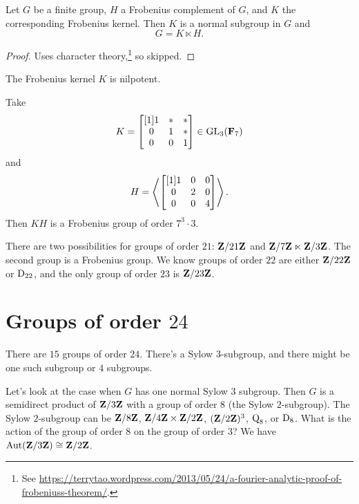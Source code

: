 \documentclass[11pt, oneside]{amsart}
\begin{document}
\begin{theorem}[Frobenius]\label{frob}
Let $G$ be a finite group, $H$ a Frobenius complement of $G$, and $K$ the corresponding Frobenius kernel. Then $K$ is a normal subgroup in $G$ and 
$$
G = K\ltimes H.
$$
\end{theorem}

\begin{proof}
Uses character theory,\footnote{See \url{https://terrytao.wordpress.com/2013/05/24/a-fourier-analytic-proof-of-frobeniuss-theorem/}.} so skipped.
\end{proof}

\begin{theorem}[Thompson]\label{thom}
The Frobenius kernel $K$ is nilpotent.
\end{theorem}
\begin{example}
Take 
$$
K = \begin{bmatrix} [1]  1 & * & * \\ 0 &1 &*\\ 0&0&1\end{bmatrix} \in \operatorname{GL}_3({\mathbf F_7})
$$
and 
$$
H = \left \langle \begin{bmatrix} [1]  1 & 0&0  \\ 0 &2 &0\\ 0&0&4\end{bmatrix}\right \rangle .
$$
Then $KH $ is a Frobenius group of order $7^3\cdot 3$.
\end{example}

There are two possibilities for groups of order $21$: $\mathbf Z/21\mathbf Z$ and $\mathbf Z/7\mathbf Z\ltimes \mathbf Z/3\mathbf Z$. The second group is a Frobenius group. We know groups of order $22$ are either $\mathbf Z/22\mathbf Z$ or $\operatorname{D}_{22}$, and the only group of order $23$ is $\mathbf Z/23\mathbf Z$.

\section{Groups of order $24$}
There are $15$ groups of order $24$. There's a Sylow $3$-subgroup, and there might be one such subgroup or $4$ subgroups. 

Let's look at the case when $G$ has one normal Sylow $3$ subgroup. Then $G$ is a semidirect product of $\mathbf Z / 3\mathbf Z$ with a group of order $8$ (the Sylow $2$-subgroup). The Sylow $2$-subgroup can be $\mathbf Z / 8\mathbf Z$, $\mathbf Z / 4\mathbf Z\times \mathbf Z / 2\mathbf Z$, $(\mathbf Z / 2\mathbf Z)^3$, $\operatorname{Q}_8$, or $\operatorname{D}_8$. What is the action of the group of order $8$ on the group of order $3$? We have $\operatorname{Aut}(\mathbf Z / 3\mathbf Z) \cong \mathbf Z / 2\mathbf Z$. 
\end{document}
